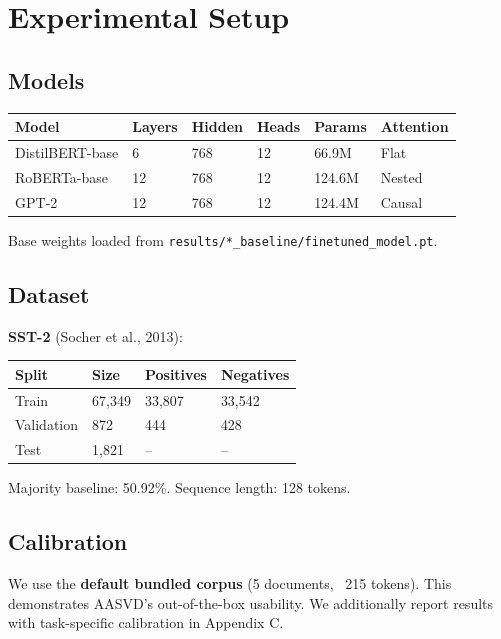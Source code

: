 
\section{Experimental Setup}

\subsection{Models}

\begin{table}[H]
\centering
\small
\begin{tabular}{llllll}
\toprule
\textbf{Model} & \textbf{Layers} & \textbf{Hidden} & \textbf{Heads} & \textbf{Params} & \textbf{Attention} \\
\midrule
DistilBERT-base & 6 & 768 & 12 & 66.9M & Flat \\
RoBERTa-base & 12 & 768 & 12 & 124.6M & Nested \\
GPT-2 & 12 & 768 & 12 & 124.4M & Causal \\
\bottomrule
\end{tabular}
\end{table}

Base weights loaded from \texttt{results/*\_baseline/finetuned\_model.pt}.

\subsection{Dataset}

\textbf{SST-2} (Socher et al., 2013):

\begin{table}[H]
\centering
\small
\begin{tabular}{llll}
\toprule
\textbf{Split} & \textbf{Size} & \textbf{Positives} & \textbf{Negatives} \\
\midrule
Train & 67,349 & 33,807 & 33,542 \\
Validation & 872 & 444 & 428 \\
Test & 1,821 & -- & -- \\
\bottomrule
\end{tabular}
\end{table}

Majority baseline: 50.92\%. Sequence length: 128 tokens.

\subsection{Calibration}

We use the \textbf{default bundled corpus} (5 documents, ~215 tokens). This 
demonstrates AASVD's out-of-the-box usability. We additionally report 
results with task-specific calibration in Appendix C.

